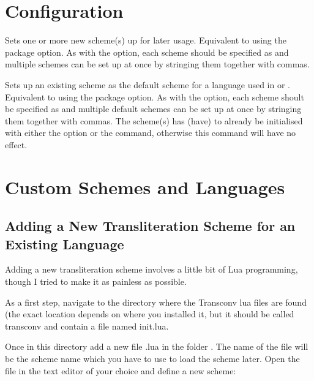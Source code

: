 \documentclass{ltxdockit}
\begin{document}
\section{Configuration}

\begin{ltxsyntax}

  Sets one or more new scheme(s) up for later usage. Equivalent to using the
   package option. As with the option, each scheme should be specified as
   and multiple schemes can be set up at once by
  stringing them together with commas.


  Sets up an existing scheme as the default scheme for a language used in
   or . Equivalent
  to using the  package option. As with the option, each
  scheme shoult be specified as  and multiple
  default schemes can be set up at once by stringing them together with commas.
  The scheme(s) has (have) to already be initialised with either the
   option or the  command,
  otherwise this command will have no effect.
\end{ltxsyntax}

\section{Custom Schemes and Languages}

\subsection{Adding a New Transliteration Scheme for an Existing Language}

Adding a new transliteration scheme involves a little bit of Lua programming,
though I tried to make it as painless as possible.

As a first step, navigate to the directory where the Transconv lua files are
found (the exact location depends on where you installed it, but it should be
called transconv and contain a file named init.lua.

Once in this directory add a new file .lua in the folder .
The name of the file will be the scheme name which you have to use to load the
scheme later. Open the file in the text editor of your choice and define a new
scheme:
\end{document}
